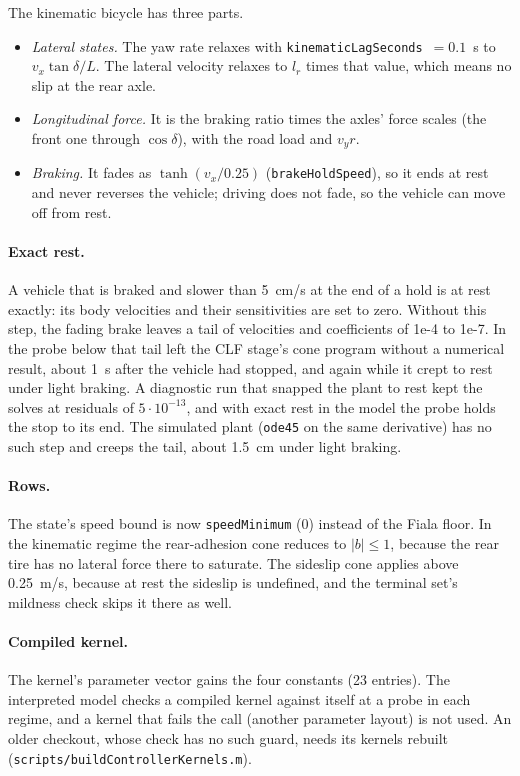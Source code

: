 \documentclass[11pt]{article}
\begin{document}
The kinematic bicycle has three parts.
\begin{itemize}
\item \emph{Lateral states.} The yaw rate relaxes with
  \texttt{kinematicLagSeconds}~$=0.1$~s to $v_x\tan\delta/L$. The lateral
  velocity relaxes to $l_r$ times that value, which means no slip at the
  rear axle.
\item \emph{Longitudinal force.} It is the braking ratio times the axles'
  force scales (the front one through $\cos\delta$), with the road load and
  $v_yr$.
\item \emph{Braking.} It fades as $\tanh(v_x/0.25)$
  (\texttt{brakeHoldSpeed}), so it ends at rest and never reverses the
  vehicle; driving does not fade, so the vehicle can move off from rest.
\end{itemize}

\paragraph{Exact rest.}
A vehicle that is braked and slower than 5~cm/s at the end of a hold is at
rest exactly: its body velocities and their sensitivities are set to zero.
Without this step, the fading brake leaves a tail of velocities and
coefficients of 1e-4 to 1e-7. In the probe below that tail left the CLF
stage's cone program without a numerical result, about 1~s after the
vehicle had stopped, and again while it crept to rest under light braking.
A diagnostic run that snapped the plant to rest kept the solves at
residuals of $5\cdot10^{-13}$, and with exact rest in the model the probe
holds the stop to its end. The
simulated plant (\texttt{ode45} on the same derivative) has no such step and
creeps the tail, about 1.5~cm under light braking.

\paragraph{Rows.}
The state's speed bound is now \texttt{speedMinimum} (0) instead of the
Fiala floor. In the kinematic regime the rear-adhesion cone reduces to
$|b|\le1$, because the rear tire has no lateral force there to saturate. The
sideslip cone applies above 0.25~m/s, because at rest the sideslip is
undefined, and the terminal set's mildness check skips it there as well.

\paragraph{Compiled kernel.}
The kernel's parameter vector gains the four constants (23 entries). The
interpreted model checks a compiled kernel against itself at a probe in each
regime, and a kernel that fails the call (another parameter layout) is not
used. An older checkout, whose check has no such guard, needs its kernels
rebuilt (\texttt{scripts/buildControllerKernels.m}).
\end{document}

